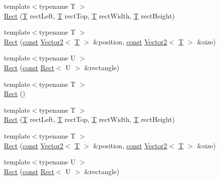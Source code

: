 \begin{DoxyCompactItemize}
{\footnotesize template$<$typename T $>$ }\\\hyperlink{classsf_1_1_rect_a53956cee21c818a3355429e3662fe384}{Rect} (\hyperlink{curses_8priv_8h_a5ef253115820acf7d27f3c5c3b02a0f0}{T} rect\-Left, \hyperlink{curses_8priv_8h_a5ef253115820acf7d27f3c5c3b02a0f0}{T} rect\-Top, \hyperlink{curses_8priv_8h_a5ef253115820acf7d27f3c5c3b02a0f0}{T} rect\-Width, \hyperlink{curses_8priv_8h_a5ef253115820acf7d27f3c5c3b02a0f0}{T} rect\-Height)
\item 
{\footnotesize template$<$typename T $>$ }\\\hyperlink{classsf_1_1_rect_a7e0ea3f83003ac89b11fd45d581059cc}{Rect} (\hyperlink{term__entry_8h_a57bd63ce7f9a353488880e3de6692d5a}{const} \hyperlink{classsf_1_1_vector2}{Vector2}$<$ \hyperlink{curses_8priv_8h_a5ef253115820acf7d27f3c5c3b02a0f0}{T} $>$ \&position, \hyperlink{term__entry_8h_a57bd63ce7f9a353488880e3de6692d5a}{const} \hyperlink{classsf_1_1_vector2}{Vector2}$<$ \hyperlink{curses_8priv_8h_a5ef253115820acf7d27f3c5c3b02a0f0}{T} $>$ \&size)
\item 
{\footnotesize template$<$typename U $>$ }\\\hyperlink{classsf_1_1_rect_a6fff2bb7e93677839461a66bc2957de0}{Rect} (\hyperlink{term__entry_8h_a57bd63ce7f9a353488880e3de6692d5a}{const} \hyperlink{classsf_1_1_rect}{Rect}$<$ U $>$ \&rectangle)
\item 
{\footnotesize template$<$typename T $>$ }\\\hyperlink{classsf_1_1_rect_a8fbc399054de8bbcd979e9062712896d}{Rect} ()
\item 
{\footnotesize template$<$typename T $>$ }\\\hyperlink{classsf_1_1_rect_a53956cee21c818a3355429e3662fe384}{Rect} (\hyperlink{curses_8priv_8h_a5ef253115820acf7d27f3c5c3b02a0f0}{T} rect\-Left, \hyperlink{curses_8priv_8h_a5ef253115820acf7d27f3c5c3b02a0f0}{T} rect\-Top, \hyperlink{curses_8priv_8h_a5ef253115820acf7d27f3c5c3b02a0f0}{T} rect\-Width, \hyperlink{curses_8priv_8h_a5ef253115820acf7d27f3c5c3b02a0f0}{T} rect\-Height)
\item 
{\footnotesize template$<$typename T $>$ }\\\hyperlink{classsf_1_1_rect_a7e0ea3f83003ac89b11fd45d581059cc}{Rect} (\hyperlink{term__entry_8h_a57bd63ce7f9a353488880e3de6692d5a}{const} \hyperlink{classsf_1_1_vector2}{Vector2}$<$ \hyperlink{curses_8priv_8h_a5ef253115820acf7d27f3c5c3b02a0f0}{T} $>$ \&position, \hyperlink{term__entry_8h_a57bd63ce7f9a353488880e3de6692d5a}{const} \hyperlink{classsf_1_1_vector2}{Vector2}$<$ \hyperlink{curses_8priv_8h_a5ef253115820acf7d27f3c5c3b02a0f0}{T} $>$ \&size)
\item 
{\footnotesize template$<$typename U $>$ }\\\hyperlink{classsf_1_1_rect_a6fff2bb7e93677839461a66bc2957de0}{Rect} (\hyperlink{term__entry_8h_a57bd63ce7f9a353488880e3de6692d5a}{const} \hyperlink{classsf_1_1_rect}{Rect}$<$ U $>$ \&rectangle)
\end{DoxyCompactItemize}
